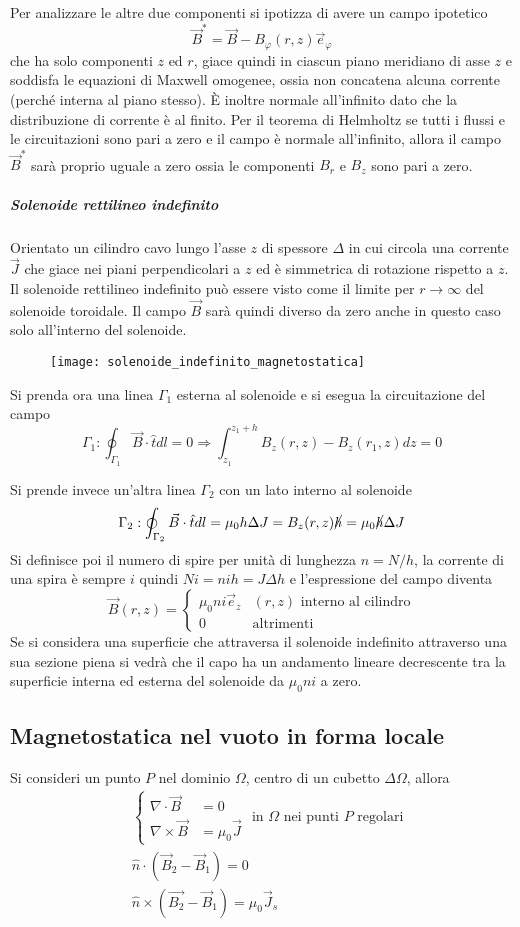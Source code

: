 Per analizzare le altre due componenti si ipotizza di avere un campo ipotetico
$$
\vec{B}^* = \vec{B} - B_\varphi(r,z)\vec{e}_\varphi
$$
che ha solo componenti $z$ ed $r$, giace quindi in ciascun piano meridiano di asse $z$
e soddisfa le equazioni di Maxwell omogenee, ossia non concatena alcuna corrente (perché interna
al piano stesso). È inoltre normale all'infinito dato che la distribuzione di corrente è al finito.
Per il teorema di Helmholtz se tutti i flussi e le circuitazioni sono pari a zero
e il campo è normale all'infinito, allora il campo $\vec{B}^*$ sarà proprio uguale a zero ossia
le componenti $B_r$ e $B_z$ sono pari a zero.

\subparagraph{Solenoide rettilineo indefinito}
Orientato un cilindro cavo lungo l'asse $z$ di spessore $\Delta$ in cui circola una corrente
$\vec{J}$ che giace nei piani perpendicolari a $z$ ed è simmetrica di rotazione rispetto a
$z$. Il solenoide rettilineo indefinito può essere visto come il limite per $r\to\infty$ del
solenoide toroidale. Il campo $\vec{B}$ sarà quindi diverso da zero anche in questo caso
solo all'interno del solenoide.
\begin{figure}[H]
\centering
\texttt{[image: solenoide\_indefinito\_magnetostatica]}
\end{figure}
Si prenda ora una linea $\Gamma_1$ esterna al solenoide e si esegua la circuitazione del campo
$$
\Gamma_1 : \oint_{\Gamma_1} \vec{B}\cdot\hat{t} dl = 0 \Rightarrow  \int_{z_1}^{z_1+h}B_z (r,z) - B_z(r_1,z)dz = 0
$$

Si prende invece un'altra linea $\Gamma_2$ con un lato interno al solenoide
$$
\Gamma_2 : \oint_{\Gamma_2} \vec{B}\cdot\hat{t}dl = \mu_0 h \Delta J = B_z(r,z) \cancel{h} =\mu_0\cancel{h}\Delta J
$$
Si definisce poi il numero di spire per unità di lunghezza $n=N/h$, la corrente di una spira è sempre $i$
quindi $Ni = nih = J\Delta h$ e l'espressione del campo diventa 
$$
\vec{B}(r,z) = 
\begin{cases}
\mu_0 n i \vec{e}_z & (r,z) \text{ interno al cilindro}\\
0 & \text{altrimenti}
\end{cases}
$$
Se si considera una superficie che attraversa il solenoide indefinito attraverso una sua sezione piena
si vedrà che il capo ha un andamento lineare decrescente tra la superficie interna ed esterna del solenoide
da $\mu_0 n i$ a zero.

\subsection{Magnetostatica nel vuoto in forma locale}
Si consideri un punto $P$ nel dominio $\Omega$, centro di un cubetto $\Delta\Omega$, allora
$$
\begin{aligned}
&\begin{cases}
\nabla\cdot\vec{B} &= 0\\
\nabla\times\vec{B} &= \mu_0\vec{J}
\end{cases} \text{ in }\Omega \text{ nei punti } P \text{ regolari} \\
&\hat{n}\cdot(\vec{B}_2-\vec{B}_1) = 0\\
&\hat{n}\times(\vec{B_2}-\vec{B}_1) = \mu_0 \vec{J}_s
\end{aligned}
$$

